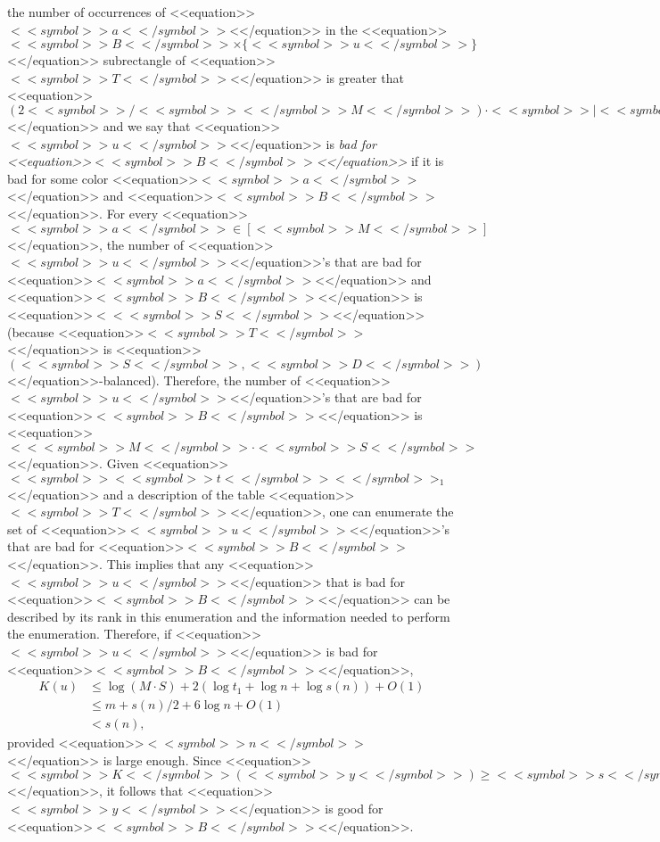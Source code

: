 \documentclass[proceedings]{stacs}
\begin{document}
the number of occurrences of <<equation>>$<<symbol>>a<</symbol>>$<</equation>> in the <<equation>>$<<symbol>>B<</symbol>> \times \{<<symbol>>u<</symbol>>\}$<</equation>> subrectangle of <<equation>>$<<symbol>>T<</symbol>>$<</equation>> is greater that <<equation>>$(2<<symbol>>/<<symbol>><</symbol>>M<</symbol>>) \cdot <<symbol>>|<<symbol>><</symbol>>B<<symbol>><</symbol>>|<</symbol>>$<</equation>> and we say that <<equation>>$<<symbol>>u<</symbol>>$<</equation>> is \emph{bad for <<equation>>$<<symbol>>B<</symbol>>$<</equation>>} if it is bad for some color <<equation>>$<<symbol>>a<</symbol>>$<</equation>> and <<equation>>$<<symbol>>B<</symbol>>$<</equation>>. For every <<equation>>$<<symbol>>a<</symbol>> \in [<<symbol>>M<</symbol>>]$<</equation>>, the number of <<equation>>$<<symbol>>u<</symbol>>$<</equation>>'s that are bad for <<equation>>$<<symbol>>a<</symbol>>$<</equation>> and <<equation>>$<<symbol>>B<</symbol>>$<</equation>> is <<equation>>$< <<symbol>>S<</symbol>>$<</equation>> (because <<equation>>$<<symbol>>T<</symbol>>$<</equation>> is <<equation>>$(<<symbol>>S<</symbol>>,<<symbol>>D<</symbol>>)$<</equation>>-balanced). Therefore, the number of <<equation>>$<<symbol>>u<</symbol>>$<</equation>>'s that are bad for <<equation>>$<<symbol>>B<</symbol>>$<</equation>> is <<equation>>$< <<symbol>>M<</symbol>> \cdot <<symbol>>S<</symbol>>$<</equation>>. Given <<equation>>$<<symbol>><<symbol>>t<</symbol>><</symbol>>_1$<</equation>> and a description of the table <<equation>>$<<symbol>>T<</symbol>>$<</equation>>, one can enumerate the set of <<equation>>$<<symbol>>u<</symbol>>$<</equation>>'s that are bad for <<equation>>$<<symbol>>B<</symbol>>$<</equation>>. This implies that any <<equation>>$<<symbol>>u<</symbol>>$<</equation>> that is bad for <<equation>>$<<symbol>>B<</symbol>>$<</equation>> can be described by its rank in this enumeration and the information needed to perform the enumeration. Therefore, if <<equation>>$<<symbol>>u<</symbol>>$<</equation>> is bad for <<equation>>$<<symbol>>B<</symbol>>$<</equation>>,
\[
\begin{array}{ll}
K(u) & \leq \log (M \cdot S) + 2 (\log t_1 + \log n + \log s(n))+O(1) \\
& \leq m + s(n)/2 + 6\log n +O(1) \\
& < s(n),
\end{array}
\]
provided <<equation>>$<<symbol>>n<</symbol>>$<</equation>> is large enough.
Since <<equation>>$<<symbol>>K<</symbol>>(<<symbol>>y<</symbol>>) \geq <<symbol>>s<</symbol>>(<<symbol>>n<</symbol>>)$<</equation>>, it follows that <<equation>>$<<symbol>>y<</symbol>>$<</equation>> is good for <<equation>>$<<symbol>>B<</symbol>>$<</equation>>.
\end{document}
